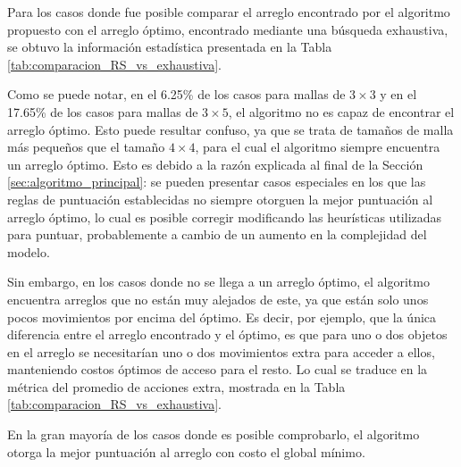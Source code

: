Para los casos donde fue posible comparar el arreglo encontrado por el algoritmo propuesto con el arreglo óptimo, encontrado mediante una búsqueda exhaustiva, se obtuvo la información estadística presentada en la Tabla \ref{tab:comparacion_RS_vs_exhaustiva}.
%
\begin{table}[H]
\renewcommand{\arraystretch}{1.4}%
%
\captionsetup{width=\tablewidth}%
\caption{Resultados del algoritmo propuesto para mallas de tamaño igual o menor a $4\times 4$.}%
\label{tab:comparacion_RS_vs_exhaustiva}%
\end{table}
%
Como se puede notar, en el 6.25\% de los casos para mallas de $3\times 3$ y en el 17.65\% de los casos para mallas de $3\times 5$, el algoritmo no es capaz de encontrar el arreglo óptimo.
Esto puede resultar confuso, ya que se trata de tamaños de malla más pequeños que el tamaño $4\times 4$, para el cual el algoritmo siempre encuentra un arreglo óptimo.
Esto es debido a la razón explicada al final de la Sección \ref{sec:algoritmo_principal}: se pueden presentar casos especiales en los que las reglas de puntuación establecidas no siempre otorguen la mejor puntuación al arreglo óptimo, lo cual es posible corregir modificando las heurísticas utilizadas para puntuar, probablemente a cambio de un aumento en la complejidad del modelo.

Sin embargo, en los casos donde no se llega a un arreglo óptimo, el algoritmo encuentra arreglos que no están muy alejados de este, ya que están solo unos pocos movimientos por encima del óptimo.
Es decir, por ejemplo, que la única diferencia entre el arreglo encontrado y el óptimo, es que para uno o dos objetos en el arreglo se necesitarían uno o dos movimientos extra para acceder a ellos, manteniendo costos óptimos de acceso para el resto.
Lo cual se traduce en la métrica del promedio de acciones extra, mostrada en la Tabla \ref{tab:comparacion_RS_vs_exhaustiva}.

En la gran mayoría de los casos donde es posible comprobarlo, el algoritmo otorga la mejor puntuación al arreglo con costo el global mínimo.